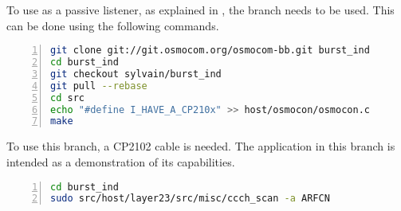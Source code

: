 To use  as a passive listener, as explained in
, the  branch needs to be
used. This can be done using the following commands.

      \begin{lstlisting}[language=bash, numbers=left,
basicstyle=\footnotesize, breaklines=true, frame=single]
git clone git://git.osmocom.org/osmocom-bb.git burst_ind
cd burst_ind
git checkout sylvain/burst_ind
git pull --rebase
cd src
echo "#define I_HAVE_A_CP210x" >> host/osmocon/osmocon.c
make
      \end{lstlisting}

To use this branch, a CP2102 cable is needed. The 
application in this branch is intended as a demonstration of its
capabilities.

      \begin{lstlisting}[language=bash, numbers=left,
basicstyle=\footnotesize, breaklines=true, frame=single]
cd burst_ind
sudo src/host/layer23/src/misc/ccch_scan -a ARFCN
      \end{lstlisting}

